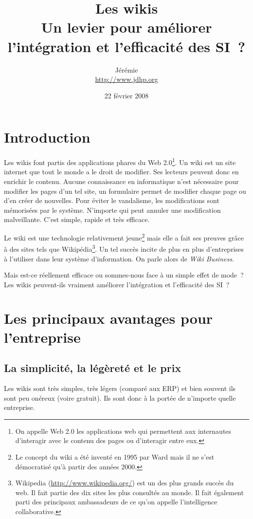 \documentclass{article}
\title{Les wikis\\\medskip
       Un levier pour améliorer l'intégration et l'efficacité des SI~?}
\author{Jérémie \bsc{Decock} \\ \url{http://www.jdhp.org}}
\date{22 février 2008}
\begin{document}
\maketitle

\section*{Introduction}
Les wikis font partis des applications phares du Web 2.0\footnote{On appelle Web 2.0 les applications web qui permettent aux internautes d'interagir avec le contenu des pages ou d'interagir entre eux.}. Un wiki est un site internet que tout le monde a le droit de modifier. Ses lecteurs peuvent donc en enrichir le contenu. Aucune connaissance en informatique n'est nécessaire pour modifier les pages d'un tel site, un formulaire permet de modifier chaque page ou d'en créer de nouvelles. Pour éviter le vandalisme, les modifications sont mémorisées par le système. N'importe qui peut annuler une modification malveillante. C'est simple, rapide et très efficace.

Le wiki est une technologie relativement jeune\footnote{Le concept du wiki a été inventé en 1995 par Ward  mais il ne s'est démocratisé qu'à partir des années 2000.} mais elle a fait ses preuves grâce à des sites tels que Wikipédia\footnote{Wikipedia (\url{http://www.wikipedia.org/}) est un des plus grands succès du web. Il fait partie des dix sites les plus consultés au monde. Il fait également parti des principaux ambassadeurs de ce qu'on appelle \og{}l'intelligence collaborative\fg{}.}. Un tel succès incite de plus en plus d'entreprises à l'utiliser dans leur système d'information. On parle alors de \emph{Wiki Business}.

Mais est-ce réellement efficace ou sommes-nous face à un simple effet de mode~? Les wikis peuvent-ils vraiment améliorer l'intégration et l'efficacité des SI~?

\section{Les principaux avantages pour l'entreprise}
\subsection{La simplicité, la légèreté et le prix}
Les wikis sont très simples, très légers (comparé aux ERP) et bien souvent ils sont peu onéreux (voire gratuit). Ils sont donc à la portée de n'importe quelle entreprise.
\end{document}

